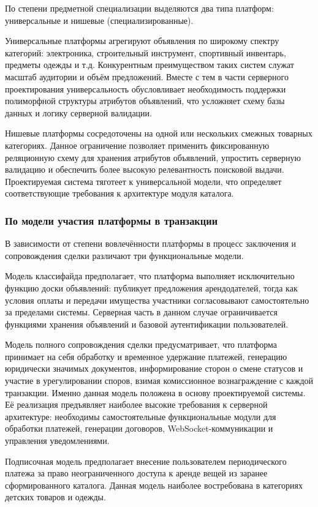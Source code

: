 По степени предметной специализации выделяются два типа платформ: универсальные и нишевые (специализированные).
 
Универсальные платформы агрегируют объявления по широкому спектру категорий: электроника, строительный инструмент, спортивный инвентарь, предметы одежды и т.д. Конкурентным преимуществом таких систем служат масштаб аудитории и объём предложений. Вместе с тем в части серверного проектирования универсальность обусловливает необходимость поддержки полиморфной структуры атрибутов объявлений, что усложняет схему базы данных и логику серверной валидации.
 
Нишевые платформы сосредоточены на одной или нескольких смежных товарных категориях. Данное ограничение позволяет применить фиксированную реляционную схему для хранения атрибутов объявлений, упростить серверную валидацию и обеспечить более высокую релевантность поисковой выдачи. Проектируемая система тяготеет к универсальной модели, что определяет соответствующие требования к архитектуре модуля каталога.
 
\subsubsection{По модели участия платформы в транзакции}
 
В зависимости от степени вовлечённости платформы в процесс заключения и сопровождения сделки различают три функциональные модели.
 
Модель классифайда предполагает, что платформа выполняет исключительно функцию доски объявлений: публикует предложения арендодателей, тогда как условия оплаты и передачи имущества участники согласовывают самостоятельно за пределами системы. Серверная часть в данном случае ограничивается функциями хранения объявлений и базовой аутентификации пользователей.
 
Модель полного сопровождения сделки предусматривает, что платформа принимает на себя обработку и временное удержание платежей, генерацию юридически значимых документов, информирование сторон о смене статусов и участие в урегулировании споров, взимая комиссионное вознаграждение с каждой транзакции. Именно данная модель положена в основу проектируемой системы. Её реализация предъявляет наиболее высокие требования к серверной архитектуре: необходимы самостоятельные функциональные модули для обработки платежей, генерации договоров, WebSocket-коммуникации и управления уведомлениями.
 
Подписочная модель предполагает внесение пользователем периодического платежа за право неограниченного доступа к аренде вещей из заранее сформированного каталога. Данная модель наиболее востребована в категориях детских товаров и одежды.
 
